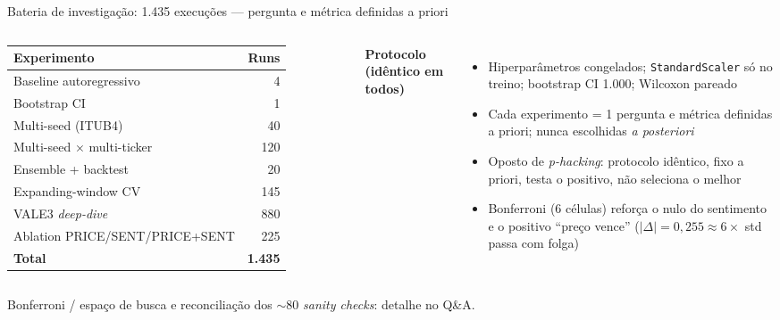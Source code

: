\documentclass[10pt,aspectratio=169]{beamer}
\begin{document}
\begin{frame}{Bateria de investigação: 1.435 execuções --- pergunta e métrica definidas a priori}
  \begin{columns}[T]
    \begin{table}
      \footnotesize
      \begin{tabular}{lr}
        \toprule
        \textbf{Experimento} & \textbf{Runs} \\
        \midrule
        Baseline autoregressivo               & 4 \\
        Bootstrap CI                          & 1 \\
        Multi-seed (ITUB4)                    & 40 \\
        Multi-seed $\times$ multi-ticker      & 120 \\
        Ensemble + backtest                   & 20 \\
        Expanding-window CV                   & 145 \\
        VALE3 \textit{deep-dive}              & 880 \\
        Ablation PRICE/SENT/PRICE+SENT        & 225 \\
        \midrule
        \textbf{Total} & \textbf{1.435} \\
        \bottomrule
      \end{tabular}
    \end{table}
    \textbf{Protocolo (idêntico em todos)}
    \begin{itemize}
      \item Hiperparâmetros congelados; \texttt{StandardScaler} só no treino; bootstrap CI 1.000; Wilcoxon pareado
      \item Cada experimento = 1 pergunta e métrica definidas a priori; nunca escolhidas \textit{a posteriori}
      \item \alert{Oposto de \textit{p-hacking}:} protocolo idêntico, fixo a priori, \alert{testa} o positivo, não seleciona o melhor
      \item Bonferroni (6 células) \alert{reforça o nulo} do sentimento \alert{e} o positivo ``preço vence'' ($|\Delta|=0{,}255\approx6\times$ std passa com folga)
    \end{itemize}
  \end{columns}
  \vspace{1ex}
  {\footnotesize Bonferroni / espaço de busca e reconciliação dos $\sim$80 \textit{sanity checks}: detalhe no Q\&A.}
\end{frame}
\end{document}
